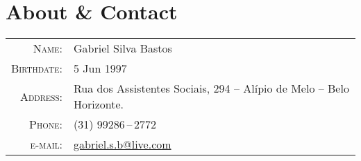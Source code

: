 \documentclass[a4paper,10pt]{article}
\renewcommand\#{\protect\scalebox{0.8}{\protect\raisebox{0.4ex}{\char"0023}}}
\begin{document}
\pagestyle{empty} %

\par{
  \bigskip
  \par
}

\section{About {\normalfont\&} Contact}

\begin{tabular}{rl}
  \textsc{Name:}      & Gabriel Silva Bastos \\
  \textsc{Birthdate:} & 5 Jun 1997 \\
  \textsc{Address:}   & Rua dos Assistentes Sociais, 294 -- Alípio de Melo -- Belo Horizonte. \\
  \textsc{Phone:}     & (31) 99286\,--\,2772 \\
  \textsc{e-mail:}    & \href{mailto:gabriel.s.b@live.com}{gabriel.s.b@live.com}
\end{tabular}
\end{document}
